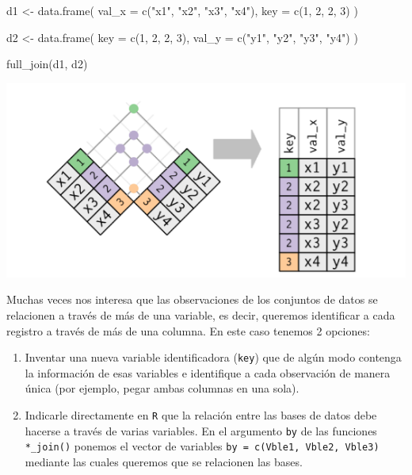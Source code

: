 \documentclass[
]{book}
\newenvironment{Shaded}{\begin{snugshade}}{\end{snugshade}}
\newcommand{\AttributeTok}[1]{\textcolor[rgb]{0.77,0.63,0.00}{#1}}
\newcommand{\DecValTok}[1]{\textcolor[rgb]{0.00,0.00,0.81}{#1}}
\newcommand{\FunctionTok}[1]{\textcolor[rgb]{0.00,0.00,0.00}{#1}}
\newcommand{\NormalTok}[1]{#1}
\newcommand{\OtherTok}[1]{\textcolor[rgb]{0.56,0.35,0.01}{#1}}
\newcommand{\StringTok}[1]{\textcolor[rgb]{0.31,0.60,0.02}{#1}}
\begin{document}
\begin{Shaded}
\begin{Highlighting}[]
\NormalTok{d1 }\OtherTok{\textless{}{-}} \FunctionTok{data.frame}\NormalTok{(}
  \AttributeTok{val\_x =} \FunctionTok{c}\NormalTok{(}\StringTok{"x1"}\NormalTok{, }\StringTok{"x2"}\NormalTok{, }\StringTok{"x3"}\NormalTok{, }\StringTok{"x4"}\NormalTok{),}
  \AttributeTok{key =} \FunctionTok{c}\NormalTok{(}\DecValTok{1}\NormalTok{, }\DecValTok{2}\NormalTok{, }\DecValTok{2}\NormalTok{, }\DecValTok{3}\NormalTok{)}
\NormalTok{)}

\NormalTok{d2 }\OtherTok{\textless{}{-}} \FunctionTok{data.frame}\NormalTok{(}
  \AttributeTok{key =} \FunctionTok{c}\NormalTok{(}\DecValTok{1}\NormalTok{, }\DecValTok{2}\NormalTok{, }\DecValTok{2}\NormalTok{, }\DecValTok{3}\NormalTok{),}
  \AttributeTok{val\_y =} \FunctionTok{c}\NormalTok{(}\StringTok{"y1"}\NormalTok{, }\StringTok{"y2"}\NormalTok{, }\StringTok{"y3"}\NormalTok{, }\StringTok{"y4"}\NormalTok{)}
\NormalTok{)}

\FunctionTok{full\_join}\NormalTok{(d1, d2)}
\end{Highlighting}
\end{Shaded}

\begin{center}\includegraphics[width=0.5\linewidth]{images/06_archivos/2dupkeys} \end{center}

Muchas veces nos interesa que las observaciones de los conjuntos de datos se relacionen a través de más de una variable, es decir, queremos identificar a cada registro a través de más de una columna. En este caso tenemos 2 opciones:

\begin{enumerate}
\def\labelenumi{\arabic{enumi}.}
\item
  Inventar una nueva variable identificadora (\texttt{key}) que de algún modo contenga la información de esas variables e identifique a cada observación de manera única (por ejemplo, pegar ambas columnas en una sola).
\item
  Indicarle directamente en \texttt{R} que la relación entre las bases de datos debe hacerse a través de varias variables. En el argumento \texttt{by} de las funciones \texttt{*\_join()} ponemos el vector de variables \texttt{by\ =\ c(Vble1,\ Vble2,\ Vble3)} mediante las cuales queremos que se relacionen las bases.
\end{enumerate}
\end{document}
